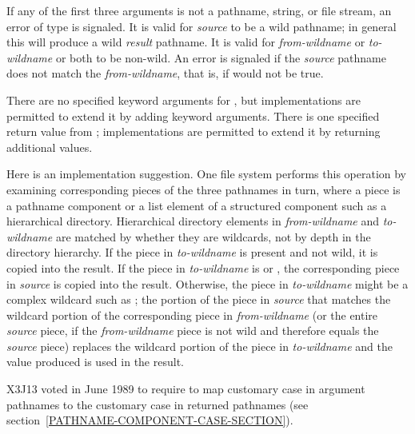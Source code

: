\begin{defun}[Function]
    If any of the first three arguments is not a pathname, string, or file
    stream, an error of type  is signaled.  It is valid for
    \emph{source} to be a wild pathname; in general this will produce a wild
    \emph{result} pathname.  It is valid for \emph{from-wildname} or \emph{to-wildname} or both
    to be non-wild.  An error is signaled if the \emph{source} pathname does not
    match the \emph{from-wildname}, that is,
    if  would not be true.
    
    There are no specified keyword arguments for , but
    implementations are permitted to extend it by adding keyword arguments.
    There is one specified return value from ;
    implementations are permitted to extend it by returning additional
    values.

    Here is an implementation suggestion.   One file system performs this operation by
    examining corresponding pieces of the three pathnames in turn, where a piece is a
    pathname component or a list element of a structured component such as
    a hierarchical directory.  Hierarchical directory elements in
    \emph{from-wildname} and \emph{to-wildname} are matched by whether they are
    wildcards, not by depth in the directory hierarchy.  If the piece in
    \emph{to-wildname} is present and not wild, it is copied into the result.
    If the piece in \emph{to-wildname} is  or , the corresponding
    piece in \emph{source} is
    copied into the result.  Otherwise, the piece in \emph{to-wildname} might be
    a complex wildcard such as ; the portion of the piece in \emph{source}
    that matches the
    wildcard portion of the corresponding piece in \emph{from-wildname} (or the entire
    \emph{source} piece, if the \emph{from-wildname} piece is not wild and therefore
    equals the \emph{source} piece) replaces the wildcard
    portion of the piece in \emph{to-wildname} and the value produced is used in
    the result.

X3J13 voted in June 1989  to
require  to map customary case in argument
pathnames to the customary case in returned pathnames
(see section~\ref{PATHNAME-COMPONENT-CASE-SECTION}).


\end{defun}
